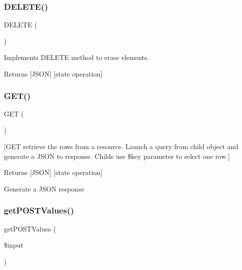 \subsubsection{\texorpdfstring{D\+E\+L\+E\+T\+E()}{DELETE()}}
{\footnotesize\ttfamily D\+E\+L\+E\+TE (\begin{DoxyParamCaption}{ }\end{DoxyParamCaption})\hspace{0.3cm}{\ttfamily [protected]}}

Implements D\+E\+L\+E\+TE method to erase elements. \begin{DoxyReturn}{Returns}
\mbox{[}J\+S\+ON\mbox{]} \mbox{[}state operation\mbox{]} 
\end{DoxyReturn}
\mbox{\label{class_resource_a6155e84d5ffcbc4ae944e98f59d49935}} 
\subsubsection{\texorpdfstring{G\+E\+T()}{GET()}}
{\footnotesize\ttfamily G\+ET (\begin{DoxyParamCaption}{ }\end{DoxyParamCaption})\hspace{0.3cm}{\ttfamily [protected]}}

\mbox{[}G\+ET retrieve the rows from a resource. Launch a query from child object and generate a J\+S\+ON to response. Childs use \$key parameter to select one row.\mbox{]} \begin{DoxyReturn}{Returns}
\mbox{[}J\+S\+ON\mbox{]} \mbox{[}state operation\mbox{]} 
\end{DoxyReturn}
Generate a J\+S\+ON response \mbox{\label{class_resource_abe4378dfc123f2572b60965349062654}} 
\subsubsection{\texorpdfstring{get\+P\+O\+S\+T\+Values()}{getPOSTValues()}}
{\footnotesize\ttfamily get\+P\+O\+S\+T\+Values (\begin{DoxyParamCaption}\item[{}]{\$input }\end{DoxyParamCaption})\hspace{0.3cm}{\ttfamily [protected]}}

